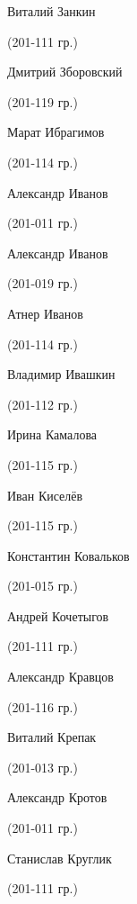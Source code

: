 \begin{multicols}{2}
\begin{small}
\begin{enumerate*}
	\item Виталий Занкин\begin{tiny} (201-111 гр.)\end{tiny}
	\item Дмитрий Зборовский\begin{tiny} (201-119 гр.)\end{tiny}
	\item Марат Ибрагимов\begin{tiny} (201-114 гр.)\end{tiny}
	\item Александр Иванов\begin{tiny} (201-011 гр.)\end{tiny}
	\item Александр Иванов\begin{tiny} (201-019 гр.)\end{tiny}
	\item Атнер Иванов\begin{tiny} (201-114 гр.)\end{tiny}
	\item Владимир Ивашкин\begin{tiny} (201-112 гр.)\end{tiny}
	\item Ирина Камалова\begin{tiny} (201-115 гр.)\end{tiny}
	\item Иван Киселёв\begin{tiny} (201-115 гр.)\end{tiny}
	\item Константин Ковальков\begin{tiny} (201-015 гр.)\end{tiny}
	\item Андрей Кочетыгов\begin{tiny} (201-111 гр.)\end{tiny}
	\item Александр Кравцов\begin{tiny} (201-116 гр.)\end{tiny}
	\item Виталий Крепак\begin{tiny} (201-013 гр.)\end{tiny}
	\item Александр Кротов\begin{tiny} (201-011 гр.)\end{tiny}
	\item Станислав Круглик\begin{tiny} (201-111 гр.)\end{tiny}

\end{enumerate*}
\end{small}
\end{multicols}
